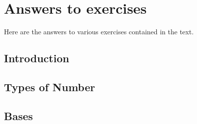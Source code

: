 \chapter{Answers to exercises} \label{answerstoexercises}
\minitoc
Here are the answers to various exercises contained in the text.
\section{Introduction}

\section{Types of Number}

\section{Bases}